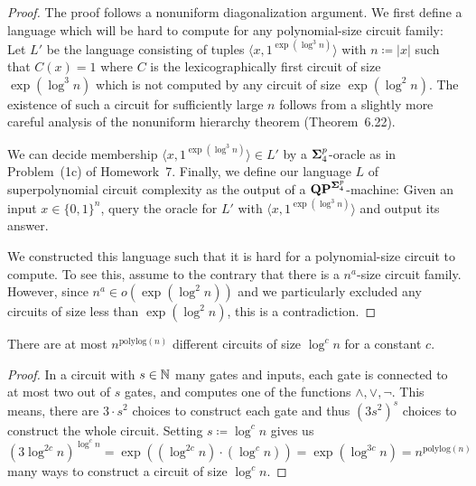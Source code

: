 \documentclass[12pt]{article}
\theoremstyle{definition}
\begin{document}
\begin{proof}
  The proof follows a nonuniform diagonalization argument. We first define
  a language which will be hard to compute for any polynomial-size circuit
  family:
  Let $L'$ be the language consisting of tuples
  $\langle x, 1^{\exp(\log^3 n)} \rangle$
  with $n \coloneqq |x|$
  such that $C(x) = 1$ where $C$ is the
  lexicographically first circuit of size $\exp(\log^3 n)$ which is not
  computed by any circuit of size $\exp(\log^2 n)$.
  The existence of such a circuit for sufficiently large $n$ follows from a
  slightly more careful analysis of the nonuniform hierarchy theorem
  (Theorem~6.22).

  We can decide membership $\langle x, 1^{\exp(\log^3 n)} \rangle \in L'$
  by a $\mathbf{\Sigma}^p_4$-oracle as in Problem~(1c) of Homework~7.
  Finally, we define our language $L$ of superpolynomial circuit complexity
  as the output of a $\mathbf{QP}^{\mathbf{\Sigma}^p_4}$-machine: Given an input
  $x \in \{0,1\}^n$, query the oracle for $L'$ with
  $\langle x, 1^{\exp(\log^3 n)} \rangle$ and output its answer.

  We constructed this language such that it is hard for a polynomial-size
  circuit to compute. To see this, assume to the contrary that there is
  a $n^a$-size circuit family.
  However, since $n^a \in o(\exp(\log^2 n))$ and we particularly excluded any
  circuits of size less than $\exp(\log^2 n)$, this is a contradiction.
\end{proof}

\begin{lemma}
  \label{lem:num-of-circs}
  There are at most $n^{\mathrm{polylog}(n)}$ different circuits of size
  $\log^c n$ for a constant $c$.
\end{lemma}

\begin{proof}
  In a circuit with $s \in {\mathbb{N}}$ many gates and inputs, each gate is connected to
  at most two out of $s$ gates, and computes one of the functions
  $\land, \lor, \neg$.
  This means, there are $3 \cdot s^2$ choices to construct each gate and thus
  $(3 s^2)^s$ choices to construct the whole circuit.
  Setting $s \coloneqq \log^c n$ gives us
  \[
    (3 \log^{2c} n)^{\log^c n}
    =
    \exp((\log^{2c} n) \cdot (\log^c n))
    =
    \exp(\log^{3c} n)
    =
    n^{\mathrm{polylog}(n)}
  \]
  many ways to construct a circuit of size $\log^c n$.
\end{proof}

\bigskip
\end{document}
